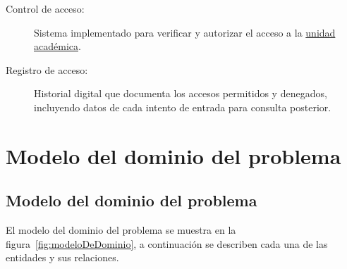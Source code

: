 \begin{description}
	\item[\hypertarget{tControlAcceso}{Control de acceso:}] Sistema implementado para verificar y autorizar el acceso a la \hyperlink{tUnidadAcademica}{unidad académica}.
	
	\item[\hypertarget{tRegistroAcceso}{Registro de acceso:}] Historial digital que documenta los accesos permitidos y denegados, incluyendo datos de cada intento de entrada para consulta posterior.
	
\end{description}
\section{Modelo del dominio del problema}
\label{sec:terminosDeNegocio}
\subsection{Modelo del dominio del problema}

El modelo del dominio del problema se muestra en la figura~\ref{fig:modeloDeDominio}, a continuación se describen cada una de las entidades y sus relaciones.

